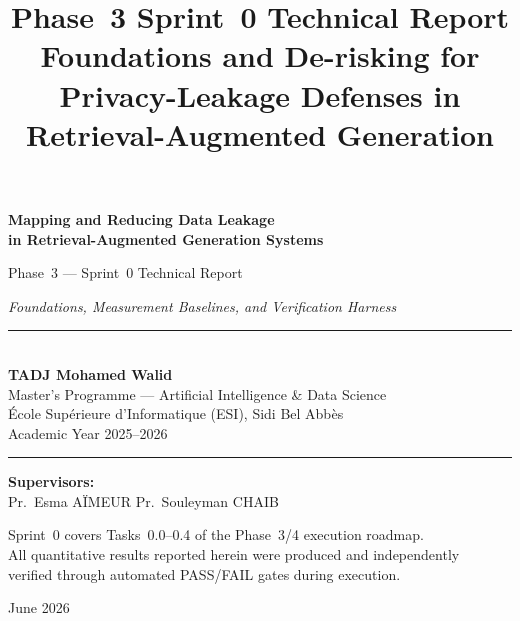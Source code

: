 \documentclass[11pt,a4paper]{article}
\title{\vspace{-1.0cm}\Large\bfseries Phase~3 Sprint~0 Technical Report\\[4pt]
\large Foundations and De-risking for Privacy-Leakage Defenses in Retrieval-Augmented Generation}
\author{}
\date{}
\begin{document}
\begin{titlepage}
\centering
\vspace*{1.5cm}

{\LARGE\bfseries Mapping and Reducing Data Leakage\\[6pt]
in Retrieval-Augmented Generation Systems\par}
\vspace{0.6cm}
{\Large Phase~3 --- Sprint~0 Technical Report\par}
\vspace{0.3cm}
{\large\itshape Foundations, Measurement Baselines, and Verification Harness\par}

\vspace{1.6cm}
\rule{0.75\textwidth}{0.5pt}\\[8pt]
{\large\bfseries TADJ Mohamed Walid}\\[4pt]
{\normalsize Master's Programme --- Artificial Intelligence \& Data Science}\\
{\normalsize \'Ecole Sup\'erieure d'Informatique (ESI), Sidi Bel Abb\`es}\\
{\normalsize Academic Year 2025--2026}\\[6pt]
\rule{0.75\textwidth}{0.5pt}

\vspace{1.0cm}
{\normalsize\textbf{Supervisors:}\\[2pt]
Pr.\ Esma A\"IMEUR \quad\textbullet\quad Pr.\ Souleyman CHAIB}

\vfill
{\small Sprint~0 covers Tasks~0.0--0.4 of the Phase~3/4 execution roadmap.\\
All quantitative results reported herein were produced and independently\\
verified through automated PASS/FAIL gates during execution.\par}
\vspace{0.6cm}
{\small June 2026}
\end{titlepage}
\end{document}
